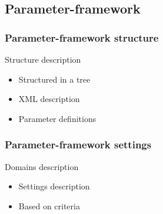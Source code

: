 \subsection{Parameter-framework}
\begin{frame}
    \frametitle{Parameter-framework structure}
    \begin{minipage}{0.40\textwidth}
    \begin{block}{Structure description}
        \begin{itemize}
            \item Structured in a tree
            \item XML description
            \item Parameter definitions
        \end{itemize}
    \end{block}
    \end{minipage}
    \begin{minipage}{0.50\textwidth}
    \end{minipage}
\end{frame}

\begin{frame}
    \frametitle{Parameter-framework settings}
    \begin{minipage}{0.40\textwidth}
    \begin{block}{Domains description}
        \begin{itemize}
            \item Settings description
            \item Based on criteria
        \end{itemize}
    \end{block}
    \end{minipage}
    \begin{minipage}{0.53\textwidth}
        
    \end{minipage}
\end{frame}
